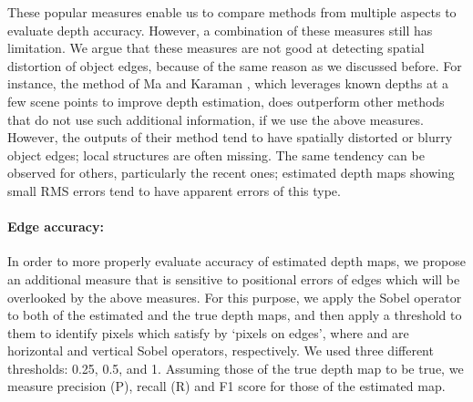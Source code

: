 \documentclass[10pt,twocolumn,letterpaper]{article}
\begin{document}
These popular measures enable us to compare methods from multiple aspects to evaluate depth accuracy. However, a combination of these measures still has limitation. We argue that these measures are not good at detecting spatial distortion of object edges, because of the same reason as we discussed before. For instance, the method of Ma and Karaman \cite{ma2017sparse}, which leverages known depths at a few scene points to improve depth estimation, does outperform other methods that do not use such additional information, if we use the above measures.
However, the outputs of their method tend to have spatially distorted or blurry object edges; local structures are often missing. The same tendency can be observed for others, particularly the recent ones; estimated depth maps showing small RMS errors tend to have apparent errors of this type.

\paragraph{Edge accuracy:} In order to more properly evaluate accuracy of estimated depth maps, we propose an additional measure that is sensitive to positional errors of edges which will be overlooked by the above measures. 
For this purpose, we apply the Sobel operator \cite{sobel19683x3} to both of the estimated and the true depth maps, and then apply a threshold to them to identify pixels which satisfy
 by `pixels on edges', 
where  and  are  horizontal and vertical Sobel operators, respectively. We used three different thresholds: 0.25, 0.5, and 1. Assuming those of the true depth map to be true, we measure precision (P), recall (R) and F1 score for those of the estimated map. 
\end{document}
